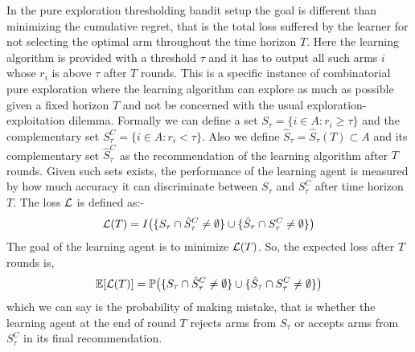 	In the pure exploration thresholding bandit setup the goal is different than minimizing the cumulative regret, that is the total loss suffered by the learner for not selecting the optimal arm throughout the time horizon $T$. Here the learning algorithm is provided with a threshold $\tau$ and it has to output all such arms $i$ whose $r_{i}$ is above $\tau$ after $T$ rounds. This is a specific instance of combinatorial pure exploration where the learning algorithm can explore as much as possible given a fixed horizon $T$ and not be concerned with the usual exploration-exploitation dilemma. Formally we can define a set $S_{\tau}=\lbrace i\in A: r_{i}\geq \tau \rbrace$ and the complementary set $S_{\tau}^{C}=\lbrace i\in A: r_{i} < \tau \rbrace$. Also we define $\hat{S}_{\tau}=\hat{S}_{\tau}(T)\subset A$ and its complementary set $\hat{S}_{\tau}^{C}$ as the recommendation of the learning algorithm after $T$ rounds. Given such sets exists, the performance of the learning agent is measured by how much accuracy it can discriminate between $S_{\tau}$ and $S_{\tau}^{C}$ after time horizon $T$. The loss $\mathcal{L}$ is defined as:-
\begin{align*}
\mathcal{L} (T) = I\big(\lbrace S_{\tau}\cap \hat{S}_{\tau}^{C}\neq \emptyset\rbrace    \cup    \lbrace\hat{S}_{\tau}\cap S_{\tau}^{C}\neq \emptyset\rbrace\big)
\end{align*}			
The goal of the learning agent is to minimize $\mathcal{L} (T)$. So, the expected loss after $T$ rounds is,
\begin{align*}
\mathbb{E}[\mathcal{L}(T)] = \mathbb{P}\big(\lbrace S_{\tau}\cap \hat{S}_{\tau}^{C} \neq \emptyset \rbrace  \cup   \lbrace \hat{S}_{\tau}\cap S_{\tau}^{C} \neq \emptyset\rbrace\big)
\end{align*}
which we can say is the probability of making mistake, that is whether the learning agent at the end of round $T$ rejects arms from $S_{\tau}$ or accepts arms from $S_{\tau}^{C}$ in its final recommendation. 

